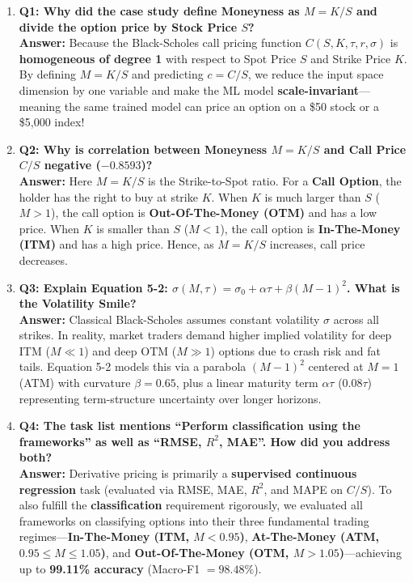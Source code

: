 \documentclass[10pt]{article}
\begin{document}
\begin{enumerate}
    \item \textbf{\color{crimson}Q1: Why did the case study define Moneyness as $M = K/S$ and divide the option price by Stock Price $S$?}\\
    \textbf{Answer:} Because the Black-Scholes call pricing function $C(S, K, \tau, r, \sigma)$ is \textbf{homogeneous of degree 1} with respect to Spot Price $S$ and Strike Price $K$. By defining $M = K/S$ and predicting $c = C/S$, we reduce the input space dimension by one variable and make the ML model \textbf{scale-invariant}---meaning the same trained model can price an option on a \$50 stock or a \$5,000 index!

    \item \textbf{\color{crimson}Q2: Why is correlation between Moneyness $M = K/S$ and Call Price $C/S$ negative ($-0.8593$)?}\\
    \textbf{Answer:} Here $M = K/S$ is the Strike-to-Spot ratio. For a \textbf{Call Option}, the holder has the right to buy at strike $K$. When $K$ is much larger than $S$ ($M > 1$), the call option is \textbf{Out-Of-The-Money (OTM)} and has a low price. When $K$ is smaller than $S$ ($M < 1$), the call option is \textbf{In-The-Money (ITM)} and has a high price. Hence, as $M = K/S$ increases, call price decreases.

    \item \textbf{\color{crimson}Q3: Explain Equation 5-2: $\sigma(M, \tau) = \sigma_0 + \alpha\tau + \beta(M - 1)^2$. What is the Volatility Smile?}\\
    \textbf{Answer:} Classical Black-Scholes assumes constant volatility $\sigma$ across all strikes. In reality, market traders demand higher implied volatility for deep ITM ($M \ll 1$) and deep OTM ($M \gg 1$) options due to crash risk and fat tails. Equation 5-2 models this via a parabola $(M-1)^2$ centered at $M=1$ (ATM) with curvature $\beta = 0.65$, plus a linear maturity term $\alpha\tau$ ($0.08\tau$) representing term-structure uncertainty over longer horizons.

    \item \textbf{\color{crimson}Q4: The task list mentions ``Perform classification using the frameworks'' as well as ``RMSE, $R^2$, MAE''. How did you address both?}\\
    \textbf{Answer:} Derivative pricing is primarily a \textbf{supervised continuous regression} task (evaluated via RMSE, MAE, $R^2$, and MAPE on $C/S$). To also fulfill the \textbf{classification} requirement rigorously, we evaluated all frameworks on classifying options into their three fundamental trading regimes---\textbf{In-The-Money (ITM, $M < 0.95$)}, \textbf{At-The-Money (ATM, $0.95 \le M \le 1.05$)}, and \textbf{Out-Of-The-Money (OTM, $M > 1.05$)}---achieving up to \textbf{99.11\% accuracy} (Macro-F1 $= 98.48\%$).


\end{enumerate}
\end{document}
